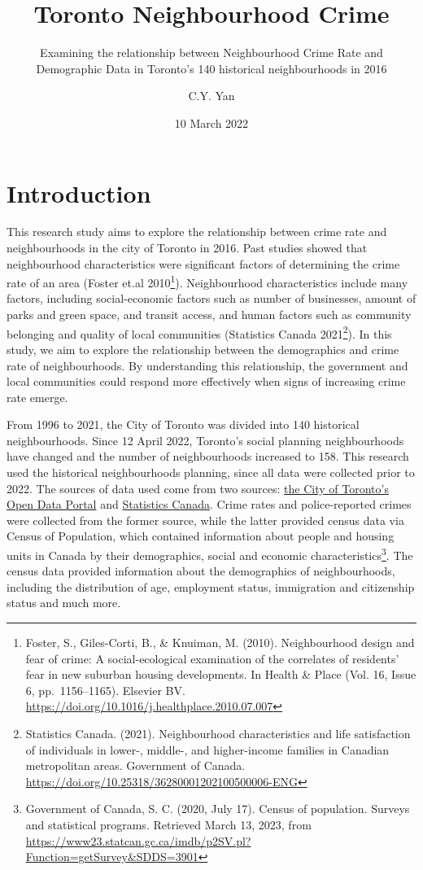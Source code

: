 \documentclass[
]{article}
\title{Toronto Neighbourhood Crime}
\subtitle{Examining the relationship between Neighbourhood Crime Rate
and Demographic Data in Toronto's 140 historical neighbourhoods in 2016}
\author{C.Y. Yan}
\date{10 March 2022}
\begin{document}
\maketitle

\hypertarget{introduction}{%
\section{Introduction}\label{introduction}}

This research study aims to explore the relationship between crime rate
and neighbourhoods in the city of Toronto in 2016. Past studies showed
that neighbourhood characteristics were significant factors of
determining the crime rate of an area (Foster et.al 2010\footnote{Foster,
  S., Giles-Corti, B., \& Knuiman, M. (2010). Neighbourhood design and
  fear of crime: A social-ecological examination of the correlates of
  residents' fear in new suburban housing developments. In Health \&
  Place (Vol. 16, Issue 6, pp.~1156--1165). Elsevier BV.
  \url{https://doi.org/10.1016/j.healthplace.2010.07.007}}).
Neighbourhood characteristics include many factors, including
social-economic factors such as number of businesses, amount of parks
and green space, and transit access, and human factors such as community
belonging and quality of local communities (Statistics Canada
2021\footnote{Statistics Canada. (2021). Neighbourhood characteristics
  and life satisfaction of individuals in lower-, middle-, and
  higher-income families in Canadian metropolitan areas. Government of
  Canada. \url{https://doi.org/10.25318/36280001202100500006-ENG}}). In
this study, we aim to explore the relationship between the demographics
and crime rate of neighbourhoods. By understanding this relationship,
the government and local communities could respond more effectively when
signs of increasing crime rate emerge.

From 1996 to 2021, the City of Toronto was divided into 140 historical
neighbourhoods. Since 12 April 2022, Toronto's social planning
neighbourhoods have changed and the number of neighbourhoods increased
to 158. This research used the historical neighbourhoods planning, since
all data were collected prior to 2022. The sources of data used come
from two sources:
\href{https://www.toronto.ca/city-government/data-research-maps/open-data/}{the
City of Toronto's Open Data Portal} and
\href{https://www.statcan.gc.ca/en/start}{Statistics Canada}. Crime
rates and police-reported crimes were collected from the former source,
while the latter provided census data via Census of Population, which
contained information about people and housing units in Canada by their
demographics, social and economic characteristics\footnote{Government of
  Canada, S. C. (2020, July 17). Census of population. Surveys and
  statistical programs. Retrieved March 13, 2023, from
  \url{https://www23.statcan.gc.ca/imdb/p2SV.pl?Function=getSurvey\&SDDS=3901}}.
The census data provided information about the demographics of
neighbourhoods, including the distribution of age, employment status,
immigration and citizenship status and much more.
\end{document}
